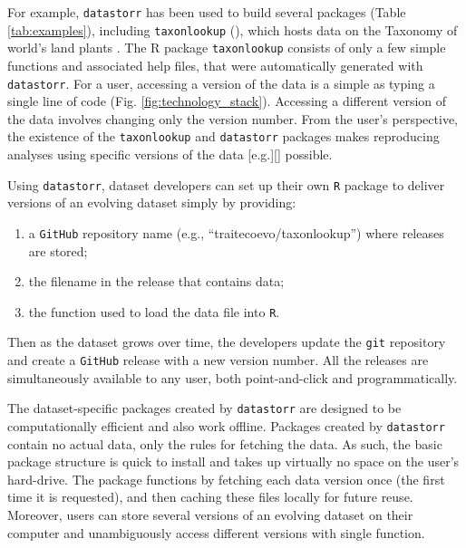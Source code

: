 \documentclass[a4paper,num-refs]{oup-contemporary}
\begin{document}
For example, \texttt{datastorr} has been used to build several packages (Table \ref{tab:examples}), including \texttt{taxonlookup} (), which hosts data on the Taxonomy of world's land plants \cite{Pennell-2015a}. The R package \texttt{taxonlookup} consists of only a few simple functions and associated help files, that were automatically generated with \texttt{datastorr}. For a user, accessing a version of the data is a simple as typing a single line of code (Fig. \ref{fig:technology_stack}). Accessing a different version of the data involves changing only the version number. From the user's perspective, the existence of the \texttt{taxonlookup} and \texttt{datastorr} packages makes reproducing analyses using specific versions of the data [e.g.][]\cite{Pennell-2015a, Mounce2018} possible.

Using \texttt{datastorr}, dataset developers can set up their own \texttt{R} package to deliver versions of an evolving dataset simply by providing:
\begin{enumerate}
  \item a \texttt{GitHub} repository name (e.g., ``traitecoevo/taxonlookup'') where releases are stored;
  \item the filename in the release that contains data;
  \item the function used to load the data file into \texttt{R}.
\end{enumerate}

Then as the dataset grows over time, the developers update the \texttt{git} repository and create a \texttt{GitHub} release with a new version number. All the releases are simultaneously available to any user, both point-and-click and programmatically.

The dataset-specific packages created by \texttt{datastorr} are designed to be computationally efficient and also work offline. Packages created by \texttt{datastorr} contain no actual data, only the rules for fetching the data. As such, the basic package structure is quick to install and takes up virtually no space on the user's hard-drive. The package functions by fetching each data version once (the first time it is requested), and then caching these files locally for future reuse. Moreover, users can store several versions of an evolving dataset on their computer and unambiguously access different versions with single function.
\end{document}
